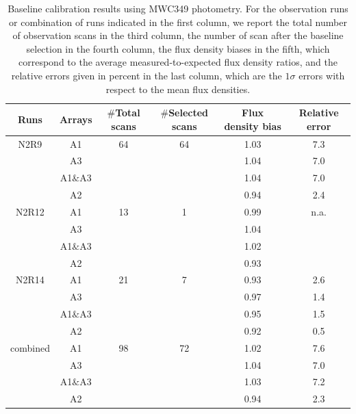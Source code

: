 \begin{table}[th]
\begin{center}
\begin{tabular}{|c|c|cccc|}
\hline
Runs & Arrays & $\#$Total scans   & $\#$Selected scans & Flux density bias  & Relative error \\ 
\hline\hline
 N2R9   & A1        & 64                 &  64         & 1.03               &  7.3    \\ 
        & A3        &                    &             & 1.04               &  7.0     \\ 
        & A1$\&$A3  &                    &             & 1.04               &  7.0    \\ 
        & A2        &                    &             & 0.94               &  2.4    \\ 
 \hline
 N2R12  & A1        & 13                 &  1          & 0.99               &  n.a.   \\ 
        & A3        &                    &             & 1.04               &         \\ 
        & A1$\&$A3  &                    &             & 1.02               &         \\ 
        & A2        &                    &             & 0.93               &         \\
 \hline
 N2R14  & A1        & 21                 &  7          & 0.93               &  2.6  \\ 
        & A3        &                    &             & 0.97               &  1.4   \\ 
        & A1$\&$A3  &                    &             & 0.95               &  1.5    \\ 
        & A2        &                    &             & 0.92               &  0.5   \\
 \hline
combined & A1        &  98                & 72         &  1.02              &  7.6  \\ 
         & A3        &                    &            &  1.04              &  7.0  \\ 
         & A1$\&$A3  &                    &            &  1.03              &  7.2   \\ 
         & A2        &                    &            &  0.94              &  2.3  \\
\hline\hline
\end{tabular}
\caption[Baseline calibration results using MWC349]{Baseline
  calibration results using MWC349 photometry. For the observation runs or combination of runs indicated in the first column, we report the total number of observation scans in the third column, the number of scan after the baseline selection in the fourth column, the flux density biases in the fifth, which correspond to the average measured-to-expected flux density ratios, and the relative errors given in percent in the last column, which are the $1\sigma$ errors with respect to the mean flux densities.}
\label{tab:baseline_calib_result_mwc349}
\end{center}
\end{table}


